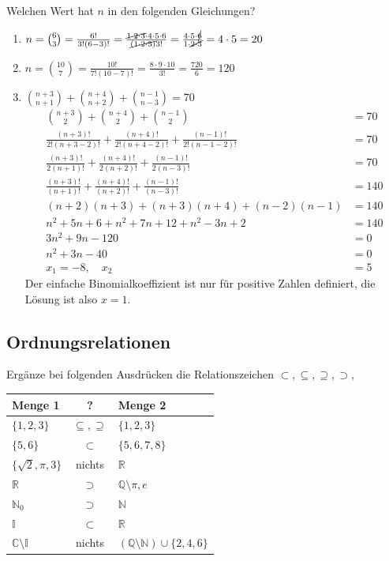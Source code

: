 \documentclass[11pt, a4paper]{article}
\begin{document}
Welchen Wert hat $n$ in den folgenden Gleichungen?
\begin{enumerate}
	\item $ n = \binom{6}{3} = \frac{6!}{3!(6-3)!} = \frac{\cancel{1\cdot2\cdot3}\cdot4\cdot5\cdot6}{\cancel{(1\cdot2\cdot3)}3!} = \frac{4\cdot5\cdot\cancel{6}}{1\cdot\cancel{2\cdot3}} = 4\cdot5 = 20$
	\item $n = \binom{10}{7} = \frac{10!}{7!(10-7)!} = \frac{8 \cdot 9 \cdot 10}{3!} = \frac{720}{6} = 120$
	\item $\binom{n+3}{n+1} + \binom{n+4}{n+2} + \binom{n-1}{n-3} = 70$
		\begin{align*}
			\binom{n+3}{2} + \binom{n+4}{2} + \binom{n-1}{2} &= 70 \\
			\frac{(n+3)!}{2!(n+3-2)!} + \frac{(n+4)!}{2!(n+4-2)!} + \frac{(n-1)!}{2!(n-1-2)!} &= 70 \tag{Definition} \\
			\frac{(n+3)!}{2(n+1)!} + \frac{(n+4)!}{2(n+2)!} + \frac{(n-1)!}{2(n-3)!} &= 70 \\
			\frac{(n+3)!}{(n+1)!} + \frac{(n+4)!}{(n+2)!} + \frac{(n-1)!}{(n-3)!} &= 140 \tag{Kürzen} \\
			(n+2)(n+3) + (n+3)(n+4) + (n-2)(n-1) &= 140 \\
			n^2+5n+6 + n^2+7n+12 + n^2-3n+2 &= 140 \\
			3n^2+9n-120 &= 0 \\
			n^2+3n-40 &= 0 \tag{PQ-Formel} \\
			x_1 = -8, \quad x_2 &= 5 \tag{Probe!}
		\end{align*}
		Der einfache Binomialkoeffizient ist nur für positive Zahlen definiert, die Lösung ist also $x=1$.
\end{enumerate}

\subsection{Ordnungsrelationen}
Ergänze bei folgenden Ausdrücken die Relationszeichen $\subset, \subseteq, \supseteq, \supset,$ \\
\begin{tabular}{|l|c|l|}
	\hline
	Menge 1 & \hspace{3mm} ? \hspace{3mm} & Menge 2 \\ \hline
	$\{1,2,3\}$ & $\subseteq, \supseteq$ & $\{1,2,3\}$ \\
	$\{5,6\}$ & $\subset$ & $\{5,6,7,8\}$ \\
	$\{\sqrt{2}, \pi, 3\}$ & nichts & $\mathbb{R}$ \\
	$\mathbb{R}$ & $\supset$ & $\mathbb{Q} \setminus {\pi, e}$ \\
	$\mathbb{N}_0$ & $\supset$ & $\mathbb{N}$ \\
	$\mathbb{I}$ & $\subset$ & $\mathbb{R}$ \\
	$\mathbb{C} \setminus \mathbb{I}$ & nichts & $\left(\mathbb{Q} \setminus \mathbb{N}\right) \cup \{2,4,6\}$ \\ \hline
\end{tabular}
\end{document}
